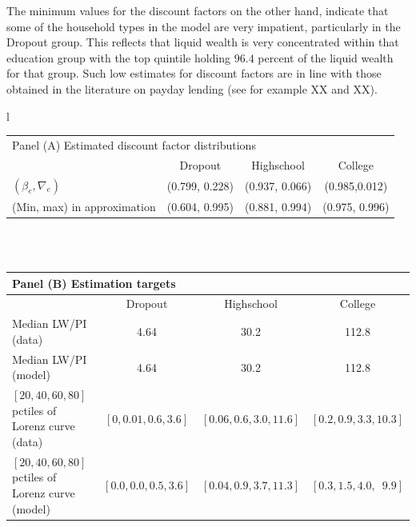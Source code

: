 \documentclass[../HAFiscal]{subfiles}
\begin{document}
The minimum values for the discount factors on the other hand, indicate that some of the household types in the model are very impatient, particularly in the Dropout group. This reflects that liquid wealth is very concentrated within that education group with the top quintile holding $96.4$ percent of the liquid wealth for that group. Such low estimates for discount factors are in line with those obtained in the literature on payday lending (see for example XX and XX). 

\begin{table}[th]
\begin{center}
\begin{tabular}{l}
	\begin{tabular}{lccc}
		\multicolumn{4}{l}{Panel (A) Estimated discount factor distributions} \\ 
		& Dropout & Highschool & College \\ \midrule
		$(\beta_e, \nabla_e)$ & (0.799, 0.228) & (0.937, 0.066) & (0.985,0.012) \\
		(Min, max) in approximation & (0.604, 0.995) & (0.881, 0.994) & (0.975, 0.996) \\
		\midrule 
	\end{tabular} \\ \\ 
	
	\begin{tabular}{lccc}
		\multicolumn{4}{l}{Panel (B) Estimation targets} \\ \midrule
		& Dropout & Highschool & College \\ \midrule
		Median LW/PI (data) & 4.64 & 30.2 & 112.8 \\ 
		Median LW/PI (model) & 4.64 & 30.2 & 112.8 \\
		$[20,40,60,80]$ pctiles of Lorenz curve (data) & $[0, 0.01, 0.6, 3.6]$ & $[0.06, 0.6, 3.0, 11.6]$ & $[0.2, 0.9, 3.3, 10.3]$ \\
		$[20,40,60,80]$ pctiles of Lorenz curve (model) & $[0.0, 0.0, 0.5, 3.6]$ & $[0.04, 0.9, 3.7, 11.3]$ & $[0.3, 1.5, 4.0, \phantom{0}9.9]$
		\\ \midrule 
	\end{tabular} \\ \\ 
	

\end{tabular}
\end{center}
\end{table}
\end{document}
